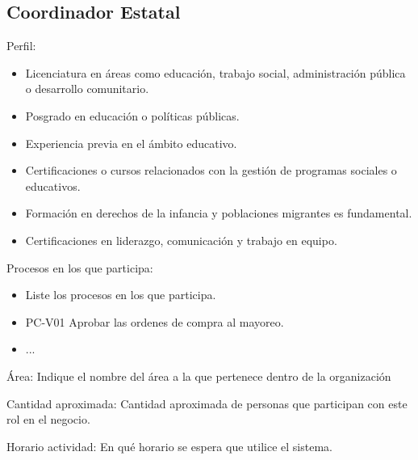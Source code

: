 \begin{Usuario}{\hypertarget{CoordinadorEstatal}{\subsection{Coordinador Estatal}}}
		\item[Perfil:] \cdtEmpty
		\begin{itemize}
			\item  Licenciatura en áreas como educación, trabajo social, administración pública o desarrollo comunitario.
			\item Posgrado en educación o políticas públicas.
            \item  Experiencia previa en el ámbito educativo.
            \item  Certificaciones o cursos relacionados con la gestión de programas sociales o educativos.
            \item  Formación en derechos de la infancia y poblaciones migrantes es fundamental.
            \item Certificaciones en liderazgo, comunicación y trabajo en equipo.
		\end{itemize}
		\item[Procesos en los que participa:] \cdtEmpty
		\begin{itemize}
			\item Liste los procesos en los que participa.
			\item PC-V01 Aprobar las ordenes de compra al mayoreo.
			\item ...
		\end{itemize}
		\item[Área:] Indique el nombre del área a la que pertenece dentro de la organización
		\item[Cantidad aproximada:] Cantidad aproximada de personas que participan con este rol en el negocio.
		\item[Horario actividad:] En qué horario se espera que utilice el sistema. 
	\end{Usuario}

